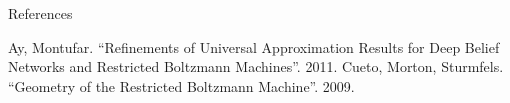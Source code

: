 \documentclass[mathserif,xcolor=dvipsnames]{beamer}
\begin{document}
\begin{frame}{References}
\begin{thebibliography}{100}
     Ay, Montufar.  ``Refinements of Universal Approximation
    Results for Deep Belief Networks and Restricted Boltzmann Machines''.
    2011.
     Cueto, Morton, Sturmfels. ``Geometry of the Restricted
    Boltzmann Machine''.  2009.
\end{thebibliography}
\end{frame}
\end{document}
